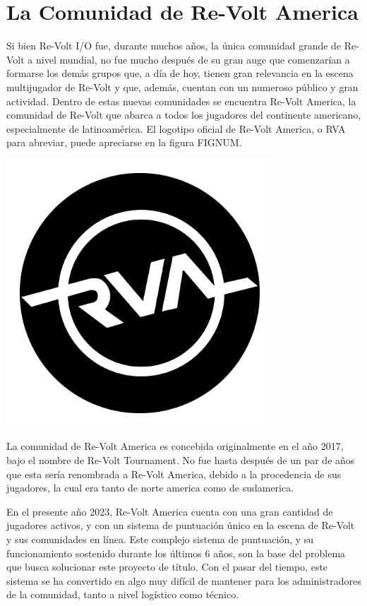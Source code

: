 \section{La Comunidad de Re-Volt America}
Si bien Re-Volt I/O fue, durante muchos años, la única comunidad grande de Re-Volt a nivel mundial, no fue mucho después de su gran auge que comenzarían a formarse los demás grupos que, a día de hoy, tienen gran relevancia en la escena multijugador de Re-Volt y que, además, cuentan con un numeroso público y gran actividad. Dentro de estas nuevas comunidades se encuentra Re-Volt America, la comunidad de Re-Volt que abarca a todos los jugadores del continente americano, especialmente de latinoamérica. El logotipo oficial de Re-Volt America, o RVA para abreviar, puede apreciarse en la figura FIGNUM.

\includegraphics[width=10cm, height=10cm]{img/rva.png}

La comunidad de Re-Volt America es concebida originalmente en el año 2017, bajo el nombre de Re-Volt Tournament. No fue hasta después de un par de años que esta sería renombrada a Re-Volt America, debido a la procedencia de sus jugadores, la cual era tanto de norte america como de sudamerica.

En el presente año 2023, Re-Volt America cuenta con una gran cantidad de jugadores activos, y con un sistema de puntuación único en la escena de Re-Volt y sus comunidades en línea. Este complejo sistema de puntuación, y su funcionamiento sostenido durante los últimos 6 años, son la base del problema que busca solucionar este proyecto de título. Con el pasar del tiempo, este sistema se ha convertido en algo muy difícil de mantener para los administradores de la comunidad, tanto a nivel logístico como técnico.

